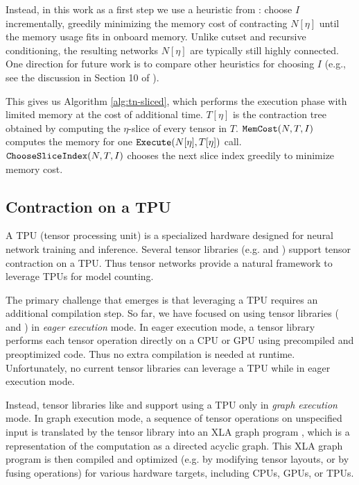 Instead, in this work as a first step we use a heuristic from \cite{CZHNS18,GK20}: choose $I$ incrementally, greedily minimizing the memory cost of contracting $N[\eta]$ until the memory usage fits in onboard memory. Unlike cutset and recursive conditioning, the resulting networks $N[\eta]$ are typically still highly connected. One direction for future work is to compare other heuristics for choosing $I$ (e.g., see the discussion in Section 10 of \cite{dechter99}).

This gives us Algorithm \ref{alg:tn-sliced}, which performs the execution phase with limited memory at the cost of additional time. $T[\eta]$ is the contraction tree obtained by computing the $\eta$-slice of every tensor in $T$. $\texttt{\upshape MemCost}(N, T, I)$ computes the memory for one $\texttt{\upshape Execute}(N[\eta], T[\eta])$ call. $\texttt{\upshape ChooseSliceIndex}(N,T,I)$ chooses the next slice index greedily to minimize memory cost.

\subsection{Contraction on a TPU}
\label{sec:parallel:execution:tpu}
A TPU (tensor processing unit) \cite{JYPPABBBBB17} is a specialized hardware designed for neural network training and inference. %
Several tensor libraries (e.g.  \cite{ABCCDDDGII16} and  \cite{jax2018github}) support tensor contraction on a TPU.
Thus tensor networks provide a natural framework to leverage TPUs for model counting.

The primary challenge that emerges is that leveraging a TPU requires an additional compilation step.
So far, we have focused on using tensor libraries ( \cite{numpy} and  \cite{ABCCDDDGII16}) in \emph{eager execution} mode.
In eager execution mode, a tensor library performs each tensor operation directly on a CPU or GPU using precompiled and preoptimized code.
Thus no extra compilation is needed at runtime.
Unfortunately, no current tensor libraries can leverage a TPU while in eager execution mode.

Instead, tensor libraries like  \cite{ABCCDDDGII16} and  \cite{jax2018github} support using a TPU only in \emph{graph execution} mode. 
In graph execution mode, a sequence of tensor operations on unspecified input is translated by the tensor library into an XLA graph program \cite{XLA}, which is a representation of the computation as a directed acyclic graph. 
This XLA graph program is then compiled and optimized (e.g. by modifying tensor layouts, or by fusing operations) for various hardware targets, including CPUs, GPUs, or TPUs. 

